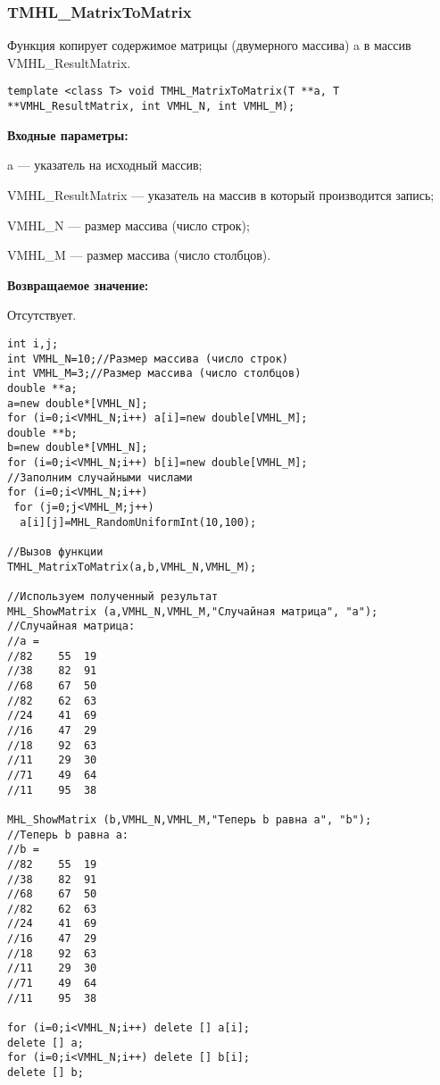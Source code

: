 \documentclass[a4paper,12pt]{article}
\begin{document}
\subsubsection{TMHL\_MatrixToMatrix}\label{TMHL_MatrixToMatrix}

Функция копирует содержимое матрицы (двумерного массива) a в массив VMHL\_ResultMatrix.


\begin{lstlisting}[label=code_syntax_TMHL_MatrixToMatrix,caption=Синтаксис]
template <class T> void TMHL_MatrixToMatrix(T **a, T **VMHL_ResultMatrix, int VMHL_N, int VMHL_M);
\end{lstlisting}

\textbf{Входные параметры:}  
 
a --- указатель на исходный массив;
 
VMHL\_ResultMatrix --- указатель на массив в который производится запись;
 
VMHL\_N --- размер массива (число строк);
 
VMHL\_M --- размер массива (число столбцов).

\textbf{Возвращаемое значение:}

Отсутствует.


\begin{lstlisting}[label=code_use_TMHL_MatrixToMatrix,caption=Пример использования]
int i,j;
int VMHL_N=10;//Размер массива (число строк)
int VMHL_M=3;//Размер массива (число столбцов)
double **a;
a=new double*[VMHL_N];
for (i=0;i<VMHL_N;i++) a[i]=new double[VMHL_M];
double **b;
b=new double*[VMHL_N];
for (i=0;i<VMHL_N;i++) b[i]=new double[VMHL_M];
//Заполним случайными числами
for (i=0;i<VMHL_N;i++)
 for (j=0;j<VMHL_M;j++)
  a[i][j]=MHL_RandomUniformInt(10,100);

//Вызов функции
TMHL_MatrixToMatrix(a,b,VMHL_N,VMHL_M);

//Используем полученный результат
MHL_ShowMatrix (a,VMHL_N,VMHL_M,"Случайная матрица", "a");
//Случайная матрица:
//a =	
//82	55	19
//38	82	91
//68	67	50
//82	62	63
//24	41	69
//16	47	29
//18	92	63
//11	29	30
//71	49	64
//11	95	38

MHL_ShowMatrix (b,VMHL_N,VMHL_M,"Теперь b равна a", "b");
//Теперь b равна a:
//b =	
//82	55	19
//38	82	91
//68	67	50
//82	62	63
//24	41	69
//16	47	29
//18	92	63
//11	29	30
//71	49	64
//11	95	38

for (i=0;i<VMHL_N;i++) delete [] a[i];
delete [] a;
for (i=0;i<VMHL_N;i++) delete [] b[i];
delete [] b;
\end{lstlisting}
\end{document}
